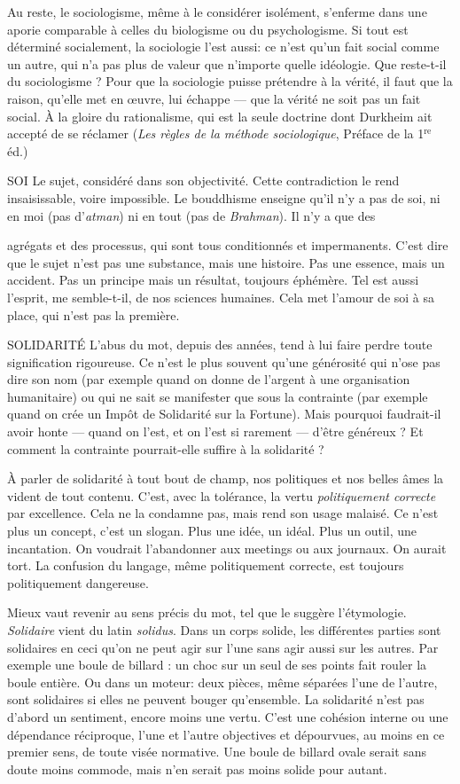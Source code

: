 Au reste, le sociologisme, même à le considérer isolément, s’enferme dans
une aporie comparable à celles du biologisme ou du psychologisme. Si tout est
déterminé socialement, la sociologie l’est aussi: ce n’est qu’un fait social
comme un autre, qui n’a pas plus de valeur que n’importe quelle idéologie.
Que reste-t-il du sociologisme ? Pour que la sociologie puisse prétendre à la
vérité, il faut que la raison, qu’elle met en œuvre, lui échappe — que la vérité ne
soit pas un fait social. À la gloire du rationalisme, qui est la seule doctrine dont
Durkheim ait accepté de se réclamer ({\it Les règles de la méthode sociologique}, Préface
de la 1$^{\text{re}}$ éd.)

SOI Le sujet, considéré dans son objectivité. Cette contradiction le rend
insaisissable, voire impossible. Le bouddhisme enseigne qu’il n’y a pas
de soi, ni en moi (pas d’{\it atman}) ni en tout (pas de {\it Brahman}). Il n’y a que des

agrégats et des processus, qui sont tous conditionnés et impermanents. C’est
dire que le sujet n’est pas une substance, mais une histoire. Pas une essence,
mais un accident. Pas un principe mais un résultat, toujours éphémère. Tel est
aussi l’esprit, me semble-t-il, de nos sciences humaines. Cela met l'amour de soi
à sa place, qui n’est pas la première.

SOLIDARITÉ L'abus du mot, depuis des années, tend à lui faire perdre
toute signification rigoureuse. Ce n’est le plus souvent qu’une
générosité qui n’ose pas dire son nom (par exemple quand on donne de l'argent
à une organisation humanitaire) ou qui ne sait se manifester que sous la
contrainte (par exemple quand on crée un Impôt de Solidarité sur la Fortune).
Mais pourquoi faudrait-il avoir honte — quand on l’est, et on l’est si
rarement — d’être généreux ? Et comment la contrainte pourrait-elle suffire à la
solidarité ?

À parler de solidarité à tout bout de champ, nos politiques et nos belles
âmes la vident de tout contenu. C’est, avec la tolérance, la vertu {\it politiquement
correcte} par excellence. Cela ne la condamne pas, mais rend son usage malaisé.
Ce n’est plus un concept, c’est un slogan. Plus une idée, un idéal. Plus un outil,
une incantation. On voudrait l’abandonner aux meetings ou aux journaux. On
aurait tort. La confusion du langage, même politiquement correcte, est toujours
politiquement dangereuse.

Mieux vaut revenir au sens précis du mot, tel que le suggère l’étymologie.
{\it Solidaire} vient du latin {\it solidus}. Dans un corps solide, les différentes parties sont
solidaires en ceci qu’on ne peut agir sur l’une sans agir aussi sur les autres. Par
exemple une boule de billard : un choc sur un seul de ses points fait rouler la
boule entière. Ou dans un moteur: deux pièces, même séparées l’une de
l’autre, sont solidaires si elles ne peuvent bouger qu’ensemble. La solidarité
n’est pas d’abord un sentiment, encore moins une vertu. C’est une cohésion
interne ou une dépendance réciproque, l’une et l’autre objectives et dépourvues,
au moins en ce premier sens, de toute visée normative. Une boule de
billard ovale serait sans doute moins commode, mais n’en serait pas moins
solide pour autant.

